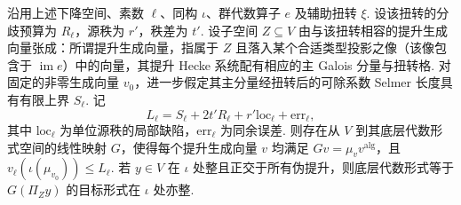 \begin{lemma}[单个提升生成向量的分母算子]
\label{lem:c-one-generator-denominator}
\emitthmsource
沿用上述下降空间、素数 $\ell$、同构 $\iota$、群代数算子 $e$ 及辅助扭转 $\xi$. 设该扭转的分歧预算为 $R_\ell$，源秩为 $r'$，秩差为 $t'$.
设子空间 $Z\subseteq V$ 由与该扭转相容的提升生成向量张成：所谓提升生成向量，指属于 $Z$ 且落入某个合适类型投影之像（该像包含于 $\operatorname{im}e$）中的向量，其提升 Hecke 系统配有相应的主 Galois 分量与扭转格.
对固定的非零生成向量 $v_0$，进一步假定其主分量经扭转后的可除系数 Selmer 长度具有有限上界 $S_\ell$. 记
\[
 L_\ell=S_\ell+2t'R_\ell+r'\mathrm{loc}_\ell+\mathrm{err}_\ell ,
\]
其中 $\mathrm{loc}_\ell$ 为单位源秩的局部缺陷，$\mathrm{err}_\ell$ 为同余误差.
则存在从 $V$ 到其底层代数形式空间的线性映射 $G$，使得每个提升生成向量 $v$ 均满足 $Gv=\mu_v v^{\mathrm{alg}}$，且 $v_\ell(\iota(\mu_{v_0}))\le L_\ell$.
若 $y\in V$ 在 $\iota$ 处整且正交于所有伪提升，则底层代数形式等于 $G(\Pi_Zy)$ 的目标形式在 $\iota$ 处亦整.
\end{lemma}
